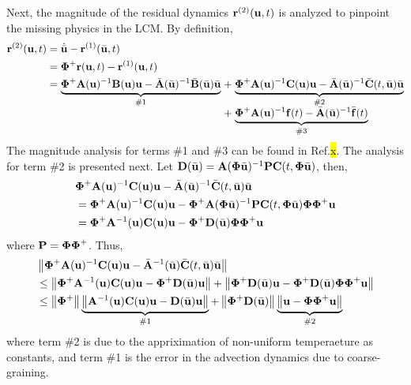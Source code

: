 Next, the magnitude of the residual dynamics $\mathbf{r}^{(2)}(\mathbf{u},t)$ is analyzed to pinpoint the missing physics in the LCM. By definition,
\begin{subequations}
\begin{align}
    \vr^{(2)}(\vu,t) &= \dot{\bvu} - \vr^{(1)}(\bvu,t) \\ 
    &= \vPhiplus\vr(\vu,t) - \vr^{(1)}(\vu,t)\\
    &= \begin{array}[t]{@{}l@{\;}c@{\;}l@{}}
       \underbrace{\vPhiplus\vA(\vu)^{-1}\vB(\vu)\vu - \bvA(\bvu)^{-1}\bvB(\bvu)\bvu}_{\text{\#1}}
       & + &
       \underbrace{\vPhiplus\vA(\vu)^{-1}\vC(\vu)\vu - \bvA(\bvu)^{-1}\bvC(t,\bvu)\bvu}_{\text{\#2}} \\
       & + &
       \underbrace{\vPhiplus\vA(\vu)^{-1}\vf(t) - \bvA(\bvu)^{-1}\bvf(t)}_{\text{\#3}}
       \end{array}
\end{align}
\end{subequations}
The magnitude analysis for terms \#1 and \#3 can be found in Ref.\hl{x}. The analysis for term \#2 is presented next. Let $\mathbf{D}(\bar{\mathbf{u}}) = \mathbf{A}(\boldsymbol{\Phi}\bar{\mathbf{u}})^{-1}\mathbf{P}\mathbf{C}(t,\boldsymbol{\Phi}\bar{\mathbf{u}})$, then,
\begin{subequations}
    \begin{align}
        &\boldsymbol{\Phi}^{+}\mathbf{A}(\mathbf{u})^{-1}\mathbf{C}(\mathbf{u})\mathbf{u} - \bar{\mathbf{A}}(\bar{\mathbf{u}})^{-1}\bar{\mathbf{C}}(t,\bar{\mathbf{u}})\bar{\mathbf{u}}\\
        &= \boldsymbol{\Phi}^{+}\mathbf{A}(\mathbf{u})^{-1}\mathbf{C}(\mathbf{u})\mathbf{u} - \boldsymbol{\Phi}^{+}\mathbf{A}(\boldsymbol{\Phi}\bar{\mathbf{u}})^{-1}\mathbf{P}\mathbf{C}(t,\boldsymbol{\Phi}\bar{\mathbf{u}})\boldsymbol{\Phi}\boldsymbol{\Phi}^{+}\mathbf{u}\\
        &= \boldsymbol{\Phi}^{+}\mathbf{A}^{-1}(\mathbf{u})\mathbf{C}(\mathbf{u})\mathbf{u} - \boldsymbol{\Phi}^{+}\mathbf{D}(\bar{\mathbf{u}})\boldsymbol{\Phi}\boldsymbol{\Phi}^{+}\mathbf{u}\\
    \end{align}
\end{subequations}
where $\mathbf{P}=\boldsymbol{\Phi}\boldsymbol{\Phi}^{+}$. Thus,
\begin{subequations}
    \begin{align}
        &\left\|\boldsymbol{\Phi}^{+}\mathbf{A}(\mathbf{u})^{-1}\mathbf{C}(\mathbf{u})\mathbf{u} - \bar{\mathbf{A}}^{-1}(\bar{\mathbf{u}})\bar{\mathbf{C}}(t,\bar{\mathbf{u}})\bar{\mathbf{u}}\right\| \\
        &\leq \left\|\boldsymbol{\Phi}^{+}\mathbf{A}^{-1}(\mathbf{u})\mathbf{C}(\mathbf{u})\mathbf{u} - \boldsymbol{\Phi}^{+}\mathbf{D}(\bar{\mathbf{u}})\mathbf{u}\right\| + \left\|\boldsymbol{\Phi}^{+}\mathbf{D}(\bar{\mathbf{u}})\mathbf{u} - \boldsymbol{\Phi}^{+}\mathbf{D}(\bar{\mathbf{u}})\boldsymbol{\Phi}\boldsymbol{\Phi}^{+}\mathbf{u}\right\|\\
        &\leq \left\|\boldsymbol{\Phi}^{+}\right\|\underbrace{\left\|\mathbf{A}^{-1}(\mathbf{u})\mathbf{C}(\mathbf{u})\mathbf{u} - \mathbf{D}(\bar{\mathbf{u}})\mathbf{u}\right\|}_{\#1} + \left\|\boldsymbol{\Phi}^{+}\mathbf{D}(\bar{\mathbf{u}})\right\|\underbrace{\left\|\mathbf{u} - \boldsymbol{\Phi}\boldsymbol{\Phi}^{+}\mathbf{u}\right\|}_{\#2}
    \end{align}
\end{subequations}
where term \#2 is due to the appriximation of non-uniform temperaeture as constants, and term \#1 is the error in the advection dynamics due to coarse-graining. 

